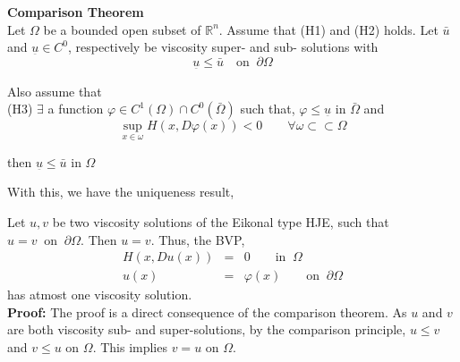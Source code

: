 \begin{theorem}
  \textbf{Comparison Theorem}\\

  \noindent
  Let $\Omega$ be a bounded open subset of $\mathbb{R}^n$. Assume that
  (H1) and (H2) holds. Let $\bar{u}$ and $\underset{\bar{}}{u} \in
  C^0$, respectively be viscosity super- and sub- solutions with
  \begin{equation}
    \underset{\bar{}}{u} \le \bar{u} \quad \text{on} \;\; \partial \Omega
  \end{equation}

  \noindent
  Also assume that\\

  (H3) $\exists$ a function $\varphi \in C^1(\Omega) \cap
  C^0(\bar{\Omega})$ such that, $\varphi \le \underset{\bar{}}{u}$ in
  $\bar{\Omega}$ and
  \begin{equation}
    \sup_{x\in \omega} H(x,D\varphi(x)) < 0 \qquad \forall \omega
    \subset \subset \Omega
  \end{equation}

  \noindent
  then $\underset{\bar{}}{u} \le \bar{u}$ in $\Omega$
\end{theorem}

\noindent
With this, we have the uniqueness result,
\begin{theorem}
  Let $u,v$ be two viscosity solutions of the Eikonal type HJE, such
  that $u = v \;\;\text{on} \;\;\partial \Omega$. Then $u = v$. Thus,
  the BVP,
  \begin{eqnarray}
    H(x,Du(x)) &=& 0 \qquad \text{in} \;\; \Omega\\
    u(x) &=& \varphi(x) \qquad \text{on} \;\; \partial \Omega
  \end{eqnarray}
  has atmost one viscosity solution.\\

  \noindent
  \textbf{Proof:} The proof is a direct consequence of the comparison
  theorem. As $u$ and $v$ are both viscosity sub- and super-solutions,
  by the comparison principle, $u \le v$ and $v \le u$ on $\Omega$. This implies
  $v = u$ on $\Omega$.
\end{theorem}
